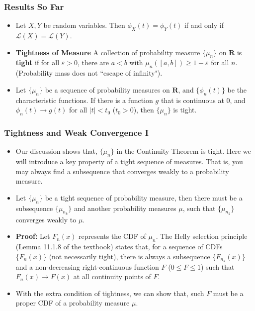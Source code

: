 \documentclass[handout]{beamer}
\begin{document}
\frame
{
  \frametitle{Results So Far} 

 \begin{itemize}
   \item<1->[] \begin{Theorem} Let $X, Y$ be random variables. Then $\phi_X(t)=\phi_Y(t)$ if and only if $\mathcal{L}(X)=\mathcal{L} (Y)$.   
   \end{Theorem}
   
 \item<2-> \textbf{Tightness of Measure} A collection of probability measure $\{\mu_n\}$ on $\mathbf{R}$ is \textbf{tight} if for all $\varepsilon>0$, there are $a<b$ with $\mu_n([a,b]) \geq 1-\varepsilon$ for all $n$. (Probability mass does not ``escape of infinity").
    
    
 
 \item<3->[] \begin{Lemma} 
 Let $\{\mu_n\}$ be a sequence of probability measures on $\mathbf{R}$, and $\{\phi_n(t)\}$ be the characteristic functions. If there is a function $g$ that is continuous at 0, and $\phi_n(t)\rightarrow g(t)$ for all $|t|<t_0$ ($t_0>0$), then $\{\mu_n\}$ is tight. 
 \end{Lemma}

   
 \end{itemize}
}


 
 \frame
{
  \frametitle{Tightness and Weak Convergence I}

 \begin{itemize}
 
 \item<1-> Our discussion shows that, $\{\mu_n\}$ in the Continuity Theorem is tight. Here we will introduce a key property of a tight sequence of measures. That is, you may always find a subsequence that converges weakly to a probability measure. 
 
  \item<2->[] \begin{Theorem}[11.1.10] 
 Let $\{\mu_n\}$ be a tight sequence of probability measure, then there must be a subsequence $\{\mu_{n_k}\}$ and another probability measures $\mu$, such that $\{\mu_{n_k}\}$ converges weakly to $\mu$.
 \end{Theorem}
 
\item<3-> \textbf{Proof:} Let $F_n(x)$ represents the CDF of $\mu_n$. The Helly selection principle (Lemma 11.1.8 of the textbook) states that, for a sequence of CDFs $\{F_n(x)\}$ (not necessarily tight), there is always a subsequence $\{F_{n_k} (x)\}$ and a non-decreasing right-continuous function $F$ ($0\leq F\leq1$) such that $F_n(x)\rightarrow F(x)$ at all continuity points of $F$.  
\item<4->[-] With the extra condition of tightness, we can show that, such $F$ must be a proper CDF of a probability measure $\mu$. 
 
\end{itemize}
 }
 
\end{document}
